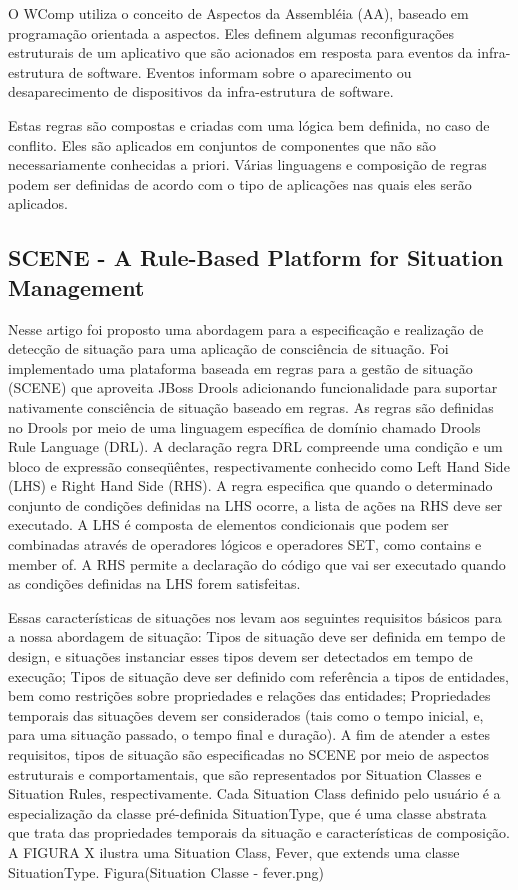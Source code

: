 \documentclass[12pt,a4paper,compsoc]{IEEEtran}
\begin{document}
O WComp utiliza o conceito de Aspectos da Assembléia (AA), baseado em programação orientada a aspectos. Eles definem algumas reconfigurações estruturais de um aplicativo que são acionados em resposta para eventos da infra-estrutura de software. Eventos informam sobre o aparecimento ou desaparecimento de dispositivos da infra-estrutura de software. 

Estas regras são compostas e criadas com uma lógica bem definida, no caso de conflito. Eles são aplicados em conjuntos de componentes que não são necessariamente conhecidas a priori. Várias linguagens e composição de regras podem ser definidas de acordo com o tipo de aplicações nas quais eles serão aplicados.


\subsection{SCENE - A Rule-Based Platform for Situation Management}

Nesse artigo foi proposto uma abordagem para a especificação e realização de detecção de situação para uma aplicação de consciência de situação. Foi implementado uma plataforma baseada em regras para a gestão de situação (SCENE) que aproveita JBoss Drools adicionando funcionalidade para suportar nativamente consciência de situação baseado em regras.
As regras são definidas no Drools por meio de uma linguagem específica de domínio chamado Drools Rule Language (DRL). A declaração regra DRL compreende uma condição e um bloco de expressão conseqüêntes, respectivamente conhecido como  Left Hand Side (LHS) e Right Hand Side (RHS). A regra especifica que quando o determinado conjunto de condições definidas na LHS ocorre, a lista de ações na RHS deve ser executado. A LHS é composta de elementos condicionais que podem ser combinadas através de operadores lógicos e operadores SET, como  contains e member of. A RHS permite a declaração do código que vai ser executado quando as condições definidas na LHS forem satisfeitas.

Essas características de situações nos levam aos seguintes requisitos básicos para a nossa abordagem de situação:
Tipos de situação deve ser definida em tempo de design, e situações instanciar esses tipos devem ser detectados em tempo de execução; 
Tipos de situação deve ser definido com referência a tipos de entidades, bem como restrições sobre propriedades e relações das entidades;
Propriedades temporais das situações devem ser considerados (tais como o tempo inicial, e, para uma situação passado, o tempo final e duração).
A fim de atender a estes requisitos, tipos de situação são especificadas no SCENE por meio de aspectos estruturais e comportamentais, que são representados por  Situation Classes e Situation Rules, respectivamente. Cada Situation Class definido pelo usuário é a especialização da classe pré-definida SituationType, que é uma classe abstrata que trata das propriedades temporais da situação e características de composição. A FIGURA X ilustra uma Situation Class, Fever, que extends uma classe SituationType.
Figura(Situation Classe - fever.png)
\end{document}
